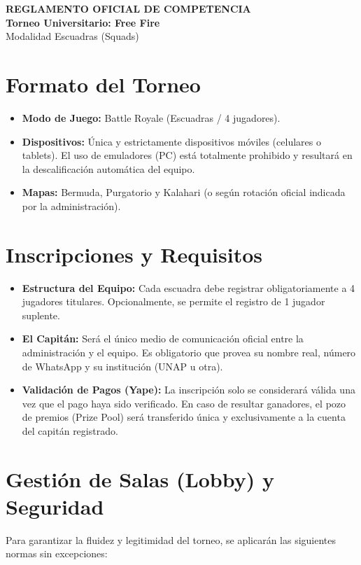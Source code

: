 \documentclass[11pt, a4paper]{article}
\begin{document}
\begin{center}
    {\Large \textbf{REGLAMENTO OFICIAL DE COMPETENCIA}}\\[0.5cm]
    {\huge \textbf{Torneo Universitario: Free Fire}}\\[0.2cm]
    {\large Modalidad Escuadras (Squads)}
\end{center}

\vspace{1cm}

\section{Formato del Torneo}
\begin{itemize}
    \item \textbf{Modo de Juego:} Battle Royale (Escuadras / 4 jugadores).
    \item \textbf{Dispositivos:} Única y estrictamente dispositivos móviles (celulares o tablets). El uso de emuladores (PC) está totalmente prohibido y resultará en la descalificación automática del equipo.
    \item \textbf{Mapas:} Bermuda, Purgatorio y Kalahari (o según rotación oficial indicada por la administración).
\end{itemize}

\section{Inscripciones y Requisitos}
\begin{itemize}
    \item \textbf{Estructura del Equipo:} Cada escuadra debe registrar obligatoriamente a 4 jugadores titulares. Opcionalmente, se permite el registro de 1 jugador suplente.
    \item \textbf{El Capitán:} Será el único medio de comunicación oficial entre la administración y el equipo. Es obligatorio que provea su nombre real, número de WhatsApp y su institución (UNAP u otra).
    \item \textbf{Validación de Pagos (Yape):} La inscripción solo se considerará válida una vez que el pago haya sido verificado. En caso de resultar ganadores, el pozo de premios (Prize Pool) será transferido única y exclusivamente a la cuenta del capitán registrado.
\end{itemize}

\section{Gestión de Salas (Lobby) y Seguridad}
Para garantizar la fluidez y legitimidad del torneo, se aplicarán las siguientes normas sin excepciones:
\end{document}
